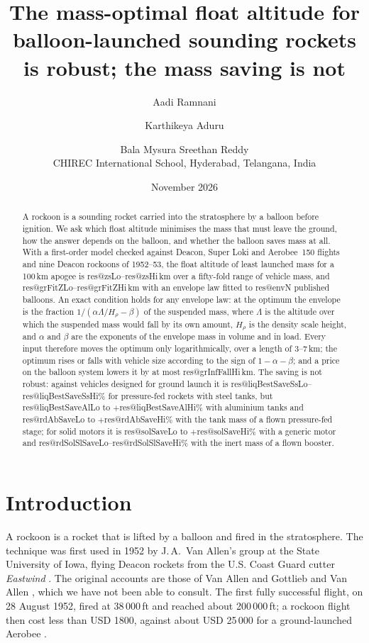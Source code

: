 \documentclass[11pt,a4paper]{article}
\title{\textbf{The mass-optimal float altitude for balloon-launched sounding rockets is robust; the mass saving is not}}
\author{Aadi Ramnani \and Karthikeya Aduru \and Bala Mysura Sreethan Reddy\\[4pt]
\small CHIREC International School, Hyderabad, Telangana, India}
\date{November 2026}
\makeatletter
\newcommand{\R}[1]{\csname res@#1\endcsname}
\makeatother
\begin{document}
\maketitle

\begin{abstract}
\noindent A rockoon is a sounding rocket carried into the stratosphere by a balloon before ignition. We ask which float altitude minimises the mass that must leave the ground, how the answer depends on the balloon, and whether the balloon saves mass at all. With a first-order model checked against Deacon, Super Loki and Aerobee~150 flights and nine Deacon rockoons of 1952--53, the float altitude of least launched mass for a 100\,km apogee is \R{zsLo}--\R{zsHi}\,km over a fifty-fold range of vehicle mass, and \R{grFitZLo}--\R{grFitZHi}\,km with an envelope law fitted to \R{envN} published balloons. An exact condition holds for any envelope law: at the optimum the envelope is the fraction $1/(\alpha\Lambda/H_\rho-\beta)$ of the suspended mass, where $\Lambda$ is the altitude over which the suspended mass would fall by its own amount, $H_\rho$ is the density scale height, and $\alpha$ and $\beta$ are the exponents of the envelope mass in volume and in load. Every input therefore moves the optimum only logarithmically, over a length of 3--7\,km; the optimum rises or falls with vehicle size according to the sign of $1-\alpha-\beta$; and a price on the balloon system lowers it by at most \R{grInfFallHi}\,km. The saving is not robust: against vehicles designed for ground launch it is \R{liqBestSaveSsLo}--\R{liqBestSaveSsHi}\% for pressure-fed rockets with steel tanks, but \R{liqBestSaveAlLo} to $+$\R{liqBestSaveAlHi}\% with aluminium tanks and \R{rdAbSaveLo} to $+$\R{rdAbSaveHi}\% with the tank mass of a flown pressure-fed stage; for solid motors it is \R{solSaveLo} to $+$\R{solSaveHi}\% with a generic motor and \R{rdSolSlSaveLo}--\R{rdSolSlSaveHi}\% with the inert mass of a flown booster.
\end{abstract}

\section{Introduction}

A rockoon is a rocket that is lifted by a balloon and fired in the stratosphere. The technique was first used in 1952 by J.\,A.~Van Allen's group at the State University of Iowa, flying Deacon rockets from the U.S. Coast Guard cutter \emph{Eastwind} \cite{ludwig2004,corliss1971}. The original accounts are those of Van Allen and Gottlieb \cite{vanallen1954} and Van Allen \cite{vanallen1959}, which we have not been able to consult. The first fully successful flight, on 28 August 1952, fired at 38\,000\,ft and reached about 200\,000\,ft; a rockoon flight then cost less than USD 1800, against about USD 25\,000 for a ground-launched Aerobee \cite{ludwig2004}.
\end{document}
